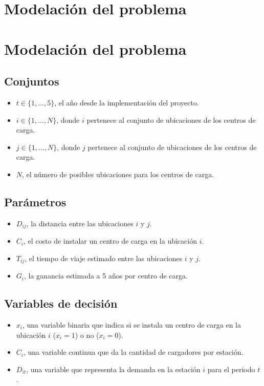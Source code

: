 \documentclass[letterpaper]{article}
\begin{document}
\begin{flushleft}
		\section{Modelación del problema}
		\section{Modelación del problema}
		\subsection{Conjuntos}
		\begin{itemize}
			\item $t \in \{1, \ldots, 5\}$, el año desde la implementación del proyecto.
			\item $i \in \{1, \ldots, N\}$, donde $i$ pertenece al conjunto de ubicaciones de los centros de carga.
			\item $j \in \{1, \ldots, N\}$, donde $j$ pertenece al conjunto de ubicaciones de los centros de carga.
			\item $N$, el número de posibles ubicaciones para los centros de carga.
		\end{itemize}
		
		\subsection{Parámetros}
		\begin{itemize}
			\item $D_{ij}$, la distancia entre las ubicaciones $i$ y $j$.
			\item $C_i$, el costo de instalar un centro de carga en la ubicación $i$.
			\item $T_{ij}$, el tiempo de viaje estimado entre las ubicaciones $i$ y $j$.
			\item $G_i$, la ganancia estimada a 5 años por centro de carga.
		\end{itemize}
		\subsection{Variables de decisión} 
		\begin{itemize}
			\item $x_i$, una variable binaria que indica si se instala un centro de carga en la ubicación $i$ ($x_i = 1$) o no ($x_i = 0$).
			\item $C_i$, una variable continua que da la cantidad de cargadores por estación.
			\item $D_{it}$, una variable que representa la demanda en la estación $i$ para el periodo $t$.
		\end{itemize}

\end{flushleft}
\end{document}
